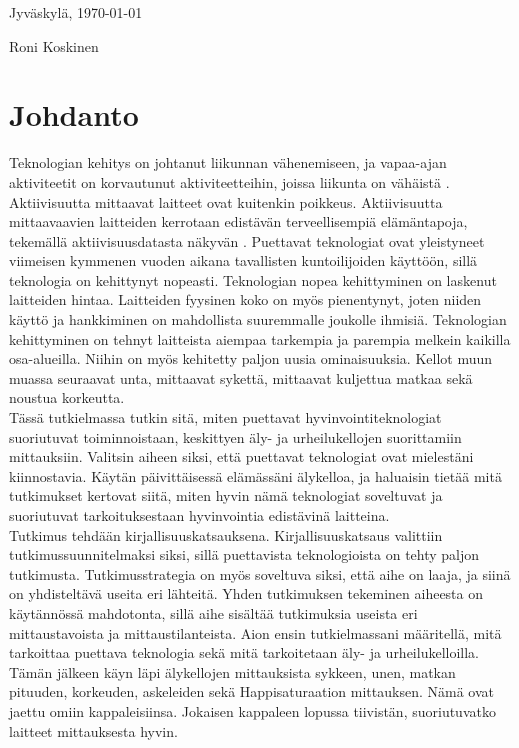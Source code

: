 \documentclass[utf8,bachelor,finnish]{bachelor}
\begin{document}
Jyväskylä, \today

\bigskip

Roni Koskinen


\mainmatter


\chapter{Johdanto}
  Teknologian kehitys on johtanut liikunnan vähenemiseen, ja vapaa-ajan aktiviteetit on korvautunut aktiviteetteihin, joissa liikunta on vähäistä \parencite{petrusevski_interventions_2021}.
   Aktiivisuutta mittaavat laitteet ovat kuitenkin poikkeus. Aktiivisuutta mittaavaavien laitteiden kerrotaan edistävän terveellisempiä elämäntapoja,
    tekemällä aktiivisuusdatasta näkyvän \parencite{shin2015understanding}.
     Puettavat teknologiat ovat yleistyneet viimeisen kymmenen vuoden aikana tavallisten kuntoilijoiden käyttöön, sillä teknologia on kehittynyt nopeasti.
      Teknologian nopea kehittyminen on laskenut laitteiden hintaa. Laitteiden fyysinen koko on myös pienentynyt, joten niiden käyttö ja hankkiminen on mahdollista suuremmalle joukolle ihmisiä.
       Teknologian kehittyminen on tehnyt laitteista aiempaa tarkempia ja parempia melkein kaikilla osa-alueilla. Niihin on myös kehitetty paljon uusia ominaisuuksia.
        Kellot muun muassa seuraavat unta, mittaavat sykettä, mittaavat kuljettua matkaa sekä noustua korkeutta.\\

  Tässä tutkielmassa tutkin sitä, miten puettavat hyvinvointiteknologiat suoriutuvat toiminnoistaan, keskittyen äly- ja urheilukellojen suorittamiin mittauksiin.
   Valitsin aiheen siksi, että puettavat teknologiat ovat mielestäni kiinnostavia. Käytän päivittäisessä elämässäni älykelloa, ja haluaisin tietää mitä tutkimukset kertovat
    siitä, miten hyvin nämä teknologiat soveltuvat ja suoriutuvat tarkoituksestaan hyvinvointia edistävinä laitteina.\\
    
  Tutkimus tehdään kirjallisuuskatsauksena. Kirjallisuuskatsaus valittiin tutkimussuunnitelmaksi siksi, sillä puettavista teknologioista on tehty paljon tutkimusta.
   Tutkimusstrategia on myös soveltuva siksi, että aihe on laaja, ja siinä on yhdisteltävä useita eri lähteitä. Yhden tutkimuksen tekeminen aiheesta on käytännössä mahdotonta,
    sillä aihe sisältää tutkimuksia useista eri mittaustavoista ja mittaustilanteista. Aion ensin tutkielmassani määritellä, mitä tarkoittaa puettava teknologia
     sekä mitä tarkoitetaan äly- ja urheilukelloilla. Tämän jälkeen käyn läpi älykellojen mittauksista sykkeen, unen, matkan pituuden, korkeuden, askeleiden sekä
      Happisaturaation mittauksen. Nämä ovat jaettu omiin kappaleisiinsa. Jokaisen kappaleen lopussa tiivistän, suoriutuvatko laitteet mittauksesta hyvin.
\end{document}
